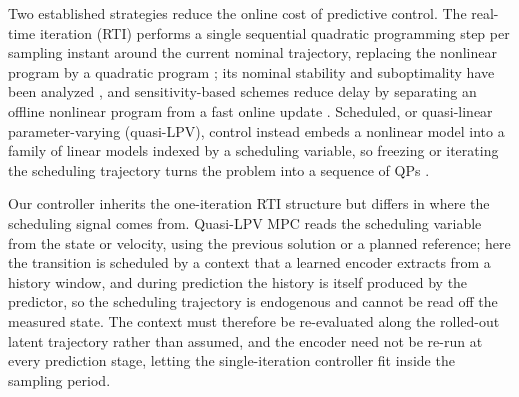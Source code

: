 Two established strategies reduce the online cost of predictive control. The real-time iteration (RTI) performs a single sequential quadratic programming step per sampling instant around the current nominal trajectory, replacing the nonlinear program by a quadratic program \cite{diehl2005realtime, gros2020rti}; its nominal stability and suboptimality have been analyzed \cite{diehl2005rtistability}, and sensitivity-based schemes reduce delay by separating an offline nonlinear program from a fast online update \cite{zavala2009advancedstep}. Scheduled, or quasi-linear parameter-varying (quasi-LPV), control instead embeds a nonlinear model into a family of linear models indexed by a scheduling variable, so freezing or iterating the scheduling trajectory turns the problem into a sequence of QPs \cite{rugh2000gain, leith1998velocity, cisneros2016qlmpc, cisneros2020qlpv}.

Our controller inherits the one-iteration RTI structure but differs in where the scheduling signal comes from. Quasi-LPV MPC reads the scheduling variable from the state or velocity, using the previous solution or a planned reference; here the transition is scheduled by a context that a learned encoder extracts from a history window, and during prediction the history is itself produced by the predictor, so the scheduling trajectory is endogenous and cannot be read off the measured state. The context must therefore be re-evaluated along the rolled-out latent trajectory rather than assumed, and the encoder need not be re-run at every prediction stage, letting the single-iteration controller fit inside the sampling period.
